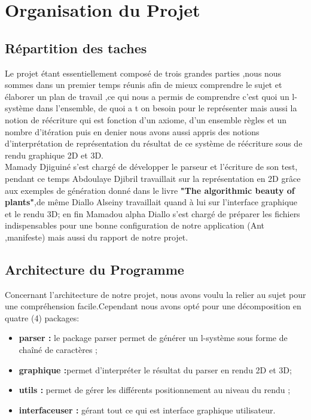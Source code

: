 
\chapter{Organisation du Projet}
\section{Répartition des taches}

Le projet étant essentiellement composé de trois grandes parties ,nous
nous sommes dans un premier temps réunis afin de mieux comprendre le
sujet et élaborer un plan de travail ,ce qui nous a permis de comprendre c'est quoi un l-système dans l’ensemble, de quoi a t on besoin pour le représenter mais
aussi la notion de réécriture qui est fonction d'un axiome, d’un ensemble règles  et un
nombre d’itération puis en denier nous avons aussi appris des notions d'interprétation
de représentation du résultat de ce système de réécriture sous de rendu graphique 2D et 3D.
\\
Mamady Djiguiné s’est chargé de développer le parseur et l’écriture de son
test, pendant ce temps Abdoulaye Djibril travaillait sur la représentation
en 2D grâce aux exemples de génération donné dans le livre \textbf{"The algorithmic beauty of plants"},de même Diallo Alseiny travaillait quand à lui sur l’interface graphique et le rendu 3D; en fin Mamadou alpha Diallo s’est chargé de préparer les fichiers indispensables pour une bonne configuration de notre application
(Ant ,manifeste) mais aussi du rapport de notre projet.

\section{Architecture du Programme}
Concernant l’architecture de notre projet, nous avons voulu la relier au
sujet pour une compréhension facile.Cependant nous avons opté pour une
décomposition en quatre (4) packages:
\\
\begin{itemize}
	\item \textbf{parser : }le package parser permet de générer un l-système sous forme de chaîné de caractères ;
	\\
	\item \textbf{graphique :}permet d’interpréter le résultat du parser en rendu 2D et 3D;
	\\
	\item \textbf{utils : } permet de gérer les différents positionnement au niveau du rendu ;
	\\
	\item \textbf{interfaceuser :}  gérant tout ce qui est interface graphique utilisateur.
\end{itemize}


